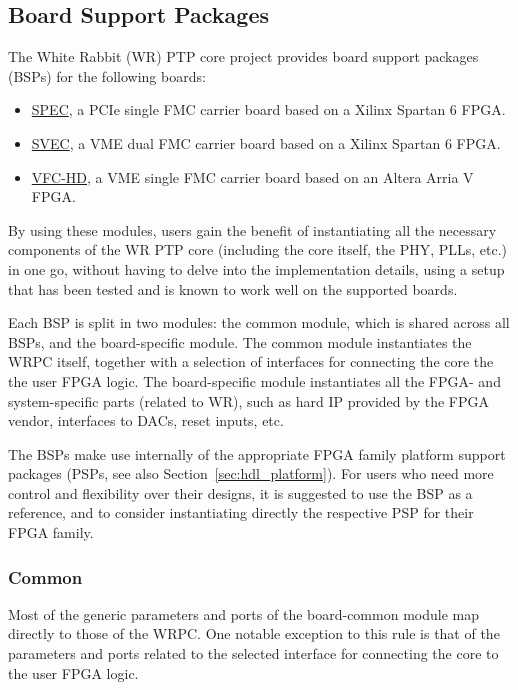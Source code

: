 \subsection{Board Support Packages}
\label{sec:hdl_board}

The White Rabbit (WR) PTP core project provides board support packages (BSPs) for the following
boards:
\begin{itemize}
\item \href{https://gitlab.com/ohwr/project/spec/wikis}{SPEC}, a PCIe single FMC carrier board based on a
  Xilinx Spartan 6 FPGA.
\item \href{https://gitlab.com/ohwr/project/svec/wikis}{SVEC}, a VME dual FMC carrier board based on a Xilinx
  Spartan 6 FPGA.
\item \href{https://gitlab.com/ohwr/project/vfc-hd/wikis}{VFC-HD}, a VME single FMC carrier board based on an
  Altera Arria V FPGA.
\end{itemize}

By using these modules, users gain the benefit of instantiating all the necessary components of the
WR PTP core (including the core itself, the PHY, PLLs, etc.) in one go, without having to delve into
the implementation details, using a setup that has been tested and is known to work well on the
supported boards.

Each BSP is split in two modules: the common module, which is shared across all BSPs, and the
board-specific module. The common module instantiates the WRPC itself, together with a selection of
interfaces for connecting the core the the user FPGA logic. The board-specific module instantiates
all the FPGA- and system-specific parts (related to WR), such as hard IP provided by the FPGA
vendor, interfaces to DACs, reset inputs, etc.

The BSPs make use internally of the appropriate FPGA family platform support packages (PSPs, see also
Section~\ref{sec:hdl_platform}). For users who need more control and flexibility over their designs,
it is suggested to use the BSP as a reference, and to consider instantiating directly the respective
PSP for their FPGA family.

\subsubsection{Common}
\label{sec:hdl_board_common}

Most of the generic parameters and ports of the board-common module map directly to those of the
WRPC. One notable exception to this rule is that of the parameters and ports related to the selected
interface for connecting the core to the user FPGA logic.

